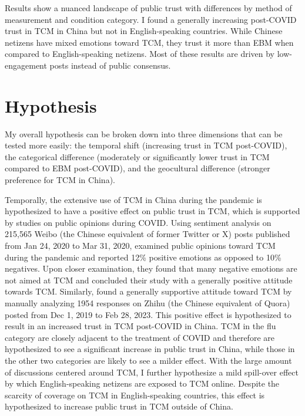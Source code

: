 \documentclass[11pt]{article}
\begin{document}
Results show a nuanced landscape of public trust with differences by method of measurement and condition category. I found a generally increasing post-COVID trust in TCM in China but not in English-speaking countries. While Chinese netizens have mixed emotions toward TCM, they trust it more than EBM when compared to English-speaking netizens. Most of these results are driven by low-engagement posts instead of public consensus.

\section{Hypothesis}

My overall hypothesis can be broken down into three dimensions that can be tested more easily: the temporal shift (increasing trust in TCM post-COVID), the categorical difference (moderately or significantly lower trust in TCM compared to EBM post-COVID), and the geocultural difference (stronger preference for TCM in China).

Temporally, the extensive use of TCM in China during the pandemic is hypothesized to have a positive effect on public trust in TCM, which is supported by studies on public opinions during COVID. Using sentiment analysis on 215,565 Weibo (the Chinese equivalent of former Twitter or X) posts published from Jan 24, 2020 to Mar 31, 2020, \textcite{gao_2021_weibo} examined public opinions toward TCM during the pandemic and reported 12\% positive emotions as opposed to 10\% negatives. Upon closer examination, they found that many negative emotions are not aimed at TCM and concluded their study with a generally positive attitude towards TCM. Similarly, \textcite{wang_2024_useful} found a generally supportive attitude toward TCM by manually analyzing 1954 responses on Zhihu (the Chinese equivalent of Quora) posted from Dec 1, 2019 to Feb 28, 2023. This positive effect is hypothesized to result in an increased trust in TCM post-COVID in China. TCM in the flu category are closely adjacent to the treatment of COVID and therefore are hypothesized to see a significant increase in public trust in China, while those in the other two categories are likely to see a milder effect. With the large amount of discussions centered around TCM, I further hypothesize a mild spill-over effect by which English-speaking netizens are exposed to TCM online. Despite the scarcity of coverage on TCM in English-speaking countries, this effect is hypothesized to increase public trust in TCM outside of China.
\end{document}
